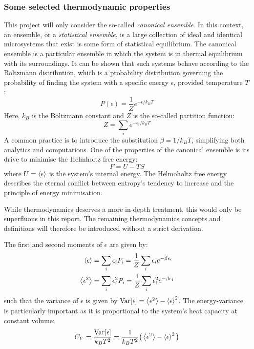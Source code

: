 \documentclass[nofootinbib,reprint,english]{revtex4-1}
\begin{document}
\subsubsection{Some selected thermodynamic properties}\label{sec:selected_thermodynamic_properties}
This project will only consider the so-called \emph{canonical ensemble}. In this context, an ensemble, or a \emph{statistical ensemble}, is a large collection of ideal and identical microsystems that exist is some form of statistical equilibrium. The canonical ensemble is a particular ensemble in which the system is in thermal equilibrium with its surroundings. It can be shown that such systems behave according to the Boltzmann distribution, which is a probability distribution governing the probability of finding the system with a specific energy \(\epsilon\), provided temperature \(T\):
\begin{equation}\label{eq:Boltzmann_Distribution}
P(\epsilon)=\frac{1}{Z}e^{-\epsilon/k_BT}
\end{equation}
Here, \(k_B\) is the Boltzmann constant and \(Z\) is the so-called partition function:
\begin{equation}\label{eq:Partition_Function}
Z=\sum_ie^{-\epsilon_i/k_BT}
\end{equation}
A common practice is to introduce the substitution \(\beta=1/k_BT\), simplifying both analytics and computations. One of the properties of the canonical ensemble is its drive to minimise the Helmholtz free energy:
\begin{equation}\label{eq:Helmholtz_Free_Energy}
F=U-TS
\end{equation}
where \(U=\expval{\epsilon}\) is the system's internal energy. The Helmoholtz free energy describes the eternal conflict between entropy's tendency to increase and the principle of energy minimisation.

While thermodynamics deserves a more in-depth treatment, this would only be superfluous in this report. The remaining thermodynamics concepts and definitions will therefore be introduced without a strict derivation.

The first and second moments of \(\epsilon\) are given by:
\begin{subequations}\label{eq:energy_moments}
\begin{align}
\expval{\epsilon}  &=\sum_i\epsilon_iP_i=\frac{1}{Z}\sum_i\epsilon_ie^{-\beta\epsilon_i}\\
\expval{\epsilon^2}&=\sum_i\epsilon_i^2P_i=\frac{1}{Z}\sum_i\epsilon_i^2e^{-\beta\epsilon_i}
\end{align}
\end{subequations}
such that the variance of \(\epsilon\) is given by \(\text{Var}[\epsilon]=\expval{\epsilon^2}-\expval{\epsilon}^2\). The energy-variance is particularly important as it is proportional to the system's heat capacity at constant volume:
\begin{equation}\label{eq:heat_capacity}
C_V=\frac{\text{Var}[\epsilon]}{k_BT^2}=\frac{1}{k_BT^2}\big(\expval{\epsilon^2}-\expval{\epsilon}^2\big)
\end{equation}
\end{document}
